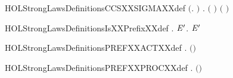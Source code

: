 \begin{SaveVerbatim}{HOLStrongLawsDefinitionsCCSXXSIGMAXXdef}
\HOLTokenTurnstile{} \ensuremath{(}\HOLSymConst{\HOLTokenForall{}}.    \HOLSymConst{\ensuremath{=}}  \ensuremath{)} \HOLSymConst{\HOLTokenConj{}}
   \HOLSymConst{\HOLTokenForall{}} .   \ensuremath{(} \ensuremath{)} \HOLSymConst{\ensuremath{=}}    \HOLSymConst{\ensuremath{+}}  \ensuremath{(} \ensuremath{)}
\end{SaveVerbatim}
\newcommand{\HOLStrongLawsDefinitionsCCSXXSIGMAXXdef}{\UseVerbatim{HOLStrongLawsDefinitionsCCSXXSIGMAXXdef}}
\begin{SaveVerbatim}{HOLStrongLawsDefinitionsIsXXPrefixXXdef}
\HOLTokenTurnstile{} \HOLSymConst{\HOLTokenForall{}}.   \HOLSymConst{\HOLTokenEquiv{}} \HOLSymConst{\HOLTokenExists{}} \ensuremath{\HOLBoundVar{E}\sp{\prime}}.  \HOLSymConst{\ensuremath{=}} \HOLSymConst{\ensuremath{\ldotp}}\ensuremath{\HOLBoundVar{E}\sp{\prime}}
\end{SaveVerbatim}
\newcommand{\HOLStrongLawsDefinitionsIsXXPrefixXXdef}{\UseVerbatim{HOLStrongLawsDefinitionsIsXXPrefixXXdef}}
\begin{SaveVerbatim}{HOLStrongLawsDefinitionsPREFXXACTXXdef}
\HOLTokenTurnstile{} \HOLSymConst{\HOLTokenForall{}} .  \ensuremath{(}\HOLSymConst{\ensuremath{\ldotp}}\ensuremath{)} \HOLSymConst{\ensuremath{=}} 
\end{SaveVerbatim}
\newcommand{\HOLStrongLawsDefinitionsPREFXXACTXXdef}{\UseVerbatim{HOLStrongLawsDefinitionsPREFXXACTXXdef}}
\begin{SaveVerbatim}{HOLStrongLawsDefinitionsPREFXXPROCXXdef}
\HOLTokenTurnstile{} \HOLSymConst{\HOLTokenForall{}} .  \ensuremath{(}\HOLSymConst{\ensuremath{\ldotp}}\ensuremath{)} \HOLSymConst{\ensuremath{=}} 
\end{SaveVerbatim}
\newcommand{\HOLStrongLawsDefinitionsPREFXXPROCXXdef}{\UseVerbatim{HOLStrongLawsDefinitionsPREFXXPROCXXdef}}
